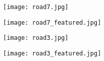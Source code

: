 \documentclass[11pt,a4paper]{article}
\begin{document}
\begin{figure}[h]
	\centering
	\begin{subfigure}{0.49\textwidth}
		\texttt{[image: road7.jpg]}
	\end{subfigure}%
	\hfill
	\begin{subfigure}{0.49\textwidth}
		\texttt{[image: road7\_featured.jpg]}
	\end{subfigure}
	\caption{ }
	\label{fig:img2}
\end{figure}

\begin{figure}[h]
	\begin{subfigure}{1\textwidth}
		\centering
		\texttt{[image: road3.jpg]}
	\end{subfigure}%
	\hfill
	\vspace{10pt}
	\begin{subfigure}{1\textwidth}
		\centering
		\texttt{[image: road3\_featured.jpg]}
	\end{subfigure}
	\hfill
	\vspace{10pt}
	\caption{ }
	\label{fig:bad}
\end{figure}



\end{document}
